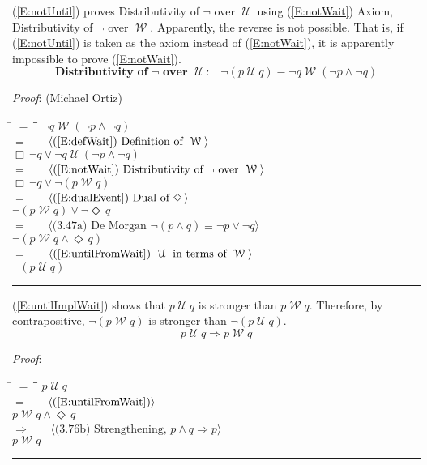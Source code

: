 \documentclass[12pt, fleqn, leqno]{article}
\newcommand{\lgap}{2pt}                             %
\newcommand{\mymathindent}{24pt}                    %
\newcommand{\impl}{\ensuremath{\Rightarrow}}        %
\newcommand{\Until}{\;\mathcal{U}\;}
\newcommand{\Wait}{\;\mathcal{W}\;}
\newcommand{\Event}{\Diamond\,}
\newcommand{\Always}{\Box\,}
\newcommand{\myqed}{\rule[-.23ex]{1.2ex}{2.0ex}}
\newcommand{\myqedtab}{\hspace{384pt}}              %
\newcommand{\Gll} {\langle}                         %
\newcommand{\Ggg} {\rangle}                         %
\newcommand{\Hint}[1]     {\ \ \ $\Gll              \mbox{#1} \Ggg$ }   %
\begin{document}
(\ref{E:notUntil}) proves Distributivity of $\neg$ over $\Until$ using (\ref{E:notWait}) Axiom, Distributivity of $\neg$ over $\Wait$.
Apparently, the reverse is not possible.
That is, if (\ref{E:notUntil}) is taken as the axiom instead of (\ref{E:notWait}), it is apparently impossible to prove (\ref{E:notWait}).
\begin{equation}\label{E:notUntil}
\textbf{Distributivity of $\neg$ over $\Until$:}\quad \neg (p \Until q) \equiv \neg q \Wait (\neg p \land \neg q)
\end{equation}

\emph{Proof}: (Michael Ortiz)
\begin{tabbing}
\hspace{\mymathindent} \= $= \;$ \= \myqedtab \= \kill
\> \> $\neg q \Wait (\neg p \land \neg q)$\\[\lgap]
\> $=$ \> \Hint{(\ref{E:defWait}) Definition of $\Wait$} \\[\lgap]
\> \> $\Always\neg q \lor \neg q\Until (\neg p \land \neg q)$\\[\lgap]
\> $=$ \> \Hint{(\ref{E:notWait}) Distributivity of $\neg$ over $\Wait$} \\[\lgap]
\> \> $\Always\neg q \lor \neg (p \Wait q)$\\[\lgap]
\> $=$  \>  \Hint{(\ref{E:dualEvent}) Dual of $\Event$}\\[\lgap]
\> \> $\neg (p \Wait q) \lor \neg\Event q $\\[\lgap]
\> $=$  \>  \Hint{(3.47a) De Morgan $\neg (p \land q) \equiv \neg p \lor \neg q$}\\[\lgap]
\> \> $\neg (p \Wait q \land \Event q)$\\[\lgap]
\> $=$  \>  \Hint{(\ref{E:untilFromWait}) $\Until$ in terms of $\Wait$}\\[\lgap]
\> \> $\neg (p \Until q)$ \quad \myqed
\end{tabbing}

(\ref{E:untilImplWait}) shows that $p\Until q$ is stronger than $p\Wait q$.
Therefore, by contrapositive, $\neg (p \Wait q)$ is stronger than $\neg (p \Until q)$.
\begin{equation}\label{E:untilImplWait}
p\Until q\impl p\Wait q
\end{equation}

\emph{Proof}:
\begin{tabbing}
\hspace{\mymathindent} \= $= \;$ \= \myqedtab \= \kill
\> \> $p\Until q$\\[\lgap]
\> $=$ \> \Hint{(\ref{E:untilFromWait})} \\[\lgap]
\> \> $p \Wait q\land \Event q$\\[\lgap]
\> $\impl$ \> \Hint{(3.76b) Strengthening, $p\land q \impl p$} \\[\lgap]
\> \> $p \Wait q$ \quad \myqed
\end{tabbing}
\end{document}
